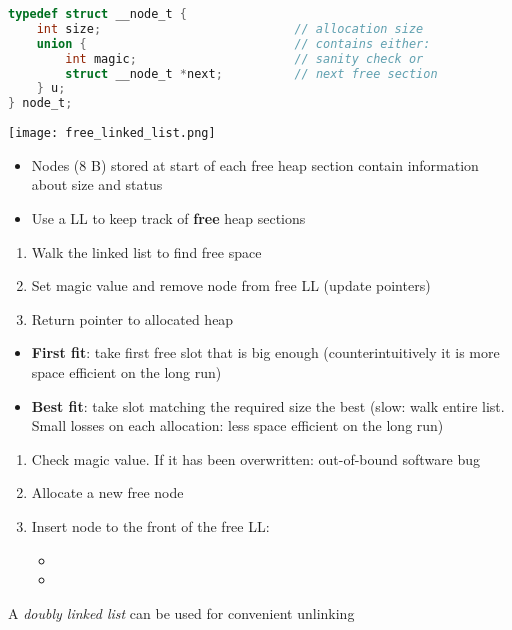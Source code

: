 \newpar{}
\begin{lstlisting}[language={C}]
typedef struct __node_t {
    int size;                           // allocation size
    union {                             // contains either:
        int magic;                      // sanity check or
        struct __node_t *next;          // next free section
    } u;
} node_t;         
\end{lstlisting}

\texttt{[image: free\_linked\_list.png]}

\begin{itemize}
    \item Nodes (8 B) stored at start of each free heap section contain information about size and status
    \item Use a LL to keep track of \textbf{free} heap sections
\end{itemize}

\newpar{}
\begin{enumerate}
    \item Walk the linked list to find free space
    \item Set magic value and remove node from free LL (update pointers)
    \item Return pointer to allocated heap
\end{enumerate}

\newpar{}
\begin{itemize}
    \item \textbf{First fit}: take first free slot that is big enough (counterintuitively it is more space efficient on the long run)
    \item \textbf{Best fit}: take slot matching the required size the best (slow: walk entire list. Small losses on each allocation: less space efficient on the long run)
\end{itemize}

\newpar{}

\begin{enumerate}
    \item Check magic value. If it has been overwritten: out-of-bound software bug
    \item Allocate a new free node
    \item Insert node to the front of the free LL:
          \begin{itemize}
              \item {}
              \item {}
          \end{itemize}
\end{enumerate}
A \textit{doubly linked list} can be used for convenient unlinking

